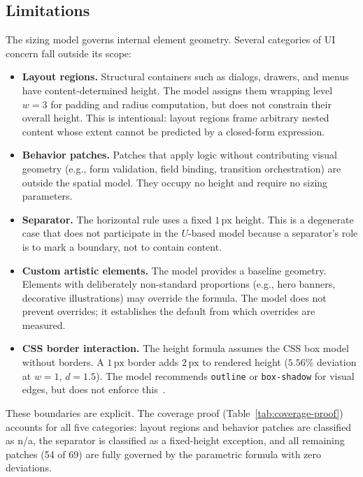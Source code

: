 \subsection{Limitations}
\label{sec:limitations}

The sizing model governs internal element geometry. Several categories of UI concern fall outside its scope:

\begin{itemize}
  \item \textbf{Layout regions.}
  Structural containers such as dialogs, drawers, and menus have content-determined height. The model assigns them wrapping level $w = 3$ for padding and radius computation, but does not constrain their overall height. This is intentional: layout regions frame arbitrary nested content whose extent cannot be predicted by a closed-form expression.

  \item \textbf{Behavior patches.}
  Patches that apply logic without contributing visual geometry (e.g., form validation, field binding, transition orchestration) are outside the spatial model. They occupy no height and require no sizing parameters.

  \item \textbf{Separator.}
  The horizontal rule uses a fixed $1\,\text{px}$ height. This is a degenerate case that does not participate in the $U$-based model because a separator's role is to mark a boundary, not to contain content.

  \item \textbf{Custom artistic elements.}
  The model provides a baseline geometry. Elements with deliberately non-standard proportions (e.g., hero banners, decorative illustrations) may override the formula. The model does not prevent overrides; it establishes the default from which overrides are measured.

  \item \textbf{CSS border interaction.}
  The height formula assumes the CSS box model without borders. A $1\,\text{px}$ border adds $2\,\text{px}$ to rendered height ($5.56\%$ deviation at $w = 1$, $d = 1.5$). The model recommends \texttt{outline} or \texttt{box-shadow} for visual edges, but does not enforce this~\cite{css-box}.
\end{itemize}

These boundaries are explicit. The coverage proof (Table~\ref{tab:coverage-proof}) accounts for all five categories: layout regions and behavior patches are classified as n/a, the separator is classified as a fixed-height exception, and all remaining patches (54 of 69) are fully governed by the parametric formula with zero deviations.
